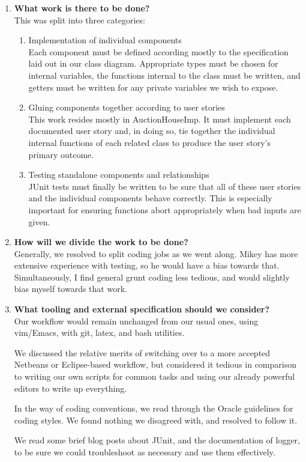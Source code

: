 \documentclass[titlepage, 12pt]{extarticle}
\begin{document}
\begin{enumerate}
    \item {\bf What work is there to be done? }\\
        This was split into three categories:
        \begin{enumerate}
            \item Implementation of individual components\\
                Each component must be defined according mostly to the specification
                laid out in our class diagram. Appropriate types must be chosen for
                internal variables, the functions internal to the class must be
                written, and getters must be written for any private variables we wish
                to expose.
            \item Gluing components together according to user stories\\
                This work resides mostly in AuctionHouseImp. It must implement each
                documented user story and, in doing so, tie together the individual
                internal functions of each related class to produce the user story's
                primary outcome.
            \item Testing standalone components and relationships\\
                JUnit tests must finally be written to be sure that all of these user
                stories and the individual components behave correctly. This is
                especially important for ensuring functions abort appropriately when
                bad inputs are given.
        \end{enumerate}
    \item {\bf How will we divide the work to be done? }\\
        Generally, we resolved to split coding jobs as we went along. Mikey has more
        extensive experience with testing, so he would have a bias towards that.
        Simultaneously, I find general grunt coding less tedious, and would slightly
        bias myself towards that work.
    \item {\bf What tooling and external specification should we consider? }\\
        Our workflow would remain unchanged from our usual ones, using vim/Emacs, with
        git, latex, and bash utilities.

        We discussed the relative merits of switching over to a more accepted Netbeans
        or Eclipse-based workflow, but considered it tedious in comparison to writing
        our own scripts for common tasks and using our already powerful editors to
        write up everything.

        In the way of coding conventions, we read through the Oracle guidelines for
        coding styles. We found nothing we disagreed with, and resolved to follow it.

        We read some brief blog posts about JUnit, and the documentation of logger, to
        be sure we could troubleshoot as necessary and use them effectively.
\end{enumerate}
\end{document}

